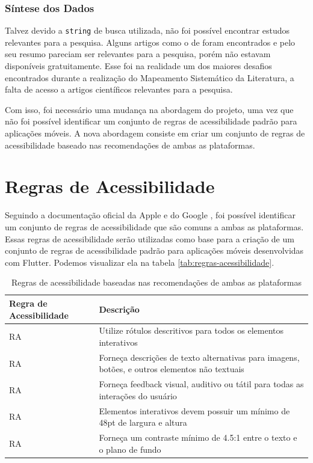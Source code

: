 \subsubsection{Síntese dos Dados}

Talvez devido a \texttt{string} de busca utilizada, não foi possível encontrar estudos relevantes para a pesquisa. Alguns artigos como o de \cite{mobileaccessibilityguidelinesadpotion} foram encontrados e pelo seu resumo pareciam ser relevantes para a pesquisa, porém não estavam disponíveis gratuitamente. Esse foi na realidade um dos maiores desafios encontrados durante a realização do Mapeamento Sistemático da Literatura, a falta de acesso a artigos científicos relevantes para a pesquisa.

Com isso, foi necessário uma mudança na abordagem do projeto, uma vez que não foi possível identificar um conjunto de regras de acessibilidade padrão para aplicações móveis. A nova abordagem consiste em criar um conjunto de regras de acessibilidade baseado nas recomendações de ambas as plataformas.

\section{Regras de Acessibilidade}

Seguindo a documentação oficial da Apple \cite{iosaccessibility} e do Google \cite{androidaccessibility}, foi possível identificar um conjunto de regras de acessibilidade que são comuns a ambas as plataformas. Essas regras de acessibilidade serão utilizadas como base para a criação de um conjunto de regras de acessibilidade padrão para aplicações móveis desenvolvidas com Flutter. Podemos visualizar ela na tabela \ref{tab:regras-acessibilidade}.

\renewcommand{\thera}{RA\arabic{ra}}

\begin{table}[!htbp]
	\centering
	\renewcommand{\arraystretch}{1.1}
	\caption{Regras de acessibilidade baseadas nas recomendações de ambas as plataformas}
	\label{tab:regras-acessibilidade}
	\begin{tabular}{ R{4cm}  L{10cm} }
		\hline
		Regra de Acessibilidade & Descrição \\
		\hline
		\thera\label{ra:tooltip} & Utilize rótulos descritivos para todos os elementos interativos \\
		\thera & Forneça descrições de texto alternativas para imagens, botões, e outros elementos não textuais \\
		\thera & Forneça feedback visual, auditivo ou tátil para todas as interações do usuário \\
		\thera & Elementos interativos devem possuir um mínimo de 48pt de largura e altura \\
		\thera & Forneça um contraste mínimo de 4.5:1 entre o texto e o plano de fundo \\
		\hline
	\end{tabular}
	\vspace{2mm}
\end{table}

